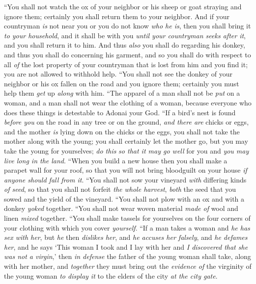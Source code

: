 \begin{biblechapter} %
\verse “You shall not watch the ox of your neighbor or his sheep or goat straying and ignore them; certainly you shall return them to your neighbor.
\verse And if your countryman \textit{is} not near you or you do not know \textit{who he is}, then you shall bring it \textit{to your household}, and it shall be with you \textit{until your countryman seeks after it}, and you shall return it to him.
\verse And thus \textit{also} you shall do regarding his donkey, and thus you shall do concerning his garment, and so you shall do with respect to all \textit{of} the lost property of your countryman that is lost from him and you find it; you are not allowed to withhold help.
\verse “You shall not see the donkey of your neighbor or his ox fallen on the road and you ignore them; certainly you must help them \textit{get} up \textit{along} with him.
\verse “The apparel of a man shall not be \textit{put} on a woman, and a man shall not wear the clothing of a woman, because everyone who does these things is detestable to Adonai your God.
\verse “If a bird’s nest is found \textit{before you} on the road in any tree or on the ground, \textit{and there are} chicks or eggs, and the mother \textit{is} lying down on the chicks or the eggs, you shall not take the mother along with the young;
\verse you shall certainly let the mother go, but you may take the young for yourselves; \textit{do this} \textit{so that it may go well} for you and \textit{you may live long in the land}.
\verse “When you build a new house then you shall make a parapet wall for your roof, so that you will not bring bloodguilt on your house \textit{if anyone should fall from it}.
\verse “You shall not sow your vineyard \textit{with} differing kinds \textit{of seed}, so that you shall not forfeit \textit{the whole harvest}, \textit{both} the seed that you sowed and the yield of the vineyard.
\verse “You shall not plow with an ox and with a donkey \textit{yoked} together.
\verse “You shall not wear woven material \textit{made of} wool and linen \textit{mixed} together.
\verse “You shall make tassels for yourselves on the four corners of your clothing with which you cover \textit{yourself}.
\verse “If a man takes a woman and \textit{he has sex with her}, but \textit{he} then \textit{dislikes her},
\verse and \textit{he accuses her falsely}, and \textit{he defames her}, and he says ‘This woman I took and I lay with her and \textit{I discovered that she was not a virgin},’
\verse then \textit{in defense} the father of the young woman shall take, along with her mother, and \textit{together} they must bring out the \textit{evidence of} the virginity of the young woman \textit{to display it} to the elders of the city \textit{at the city gate}.

\end{biblechapter}
